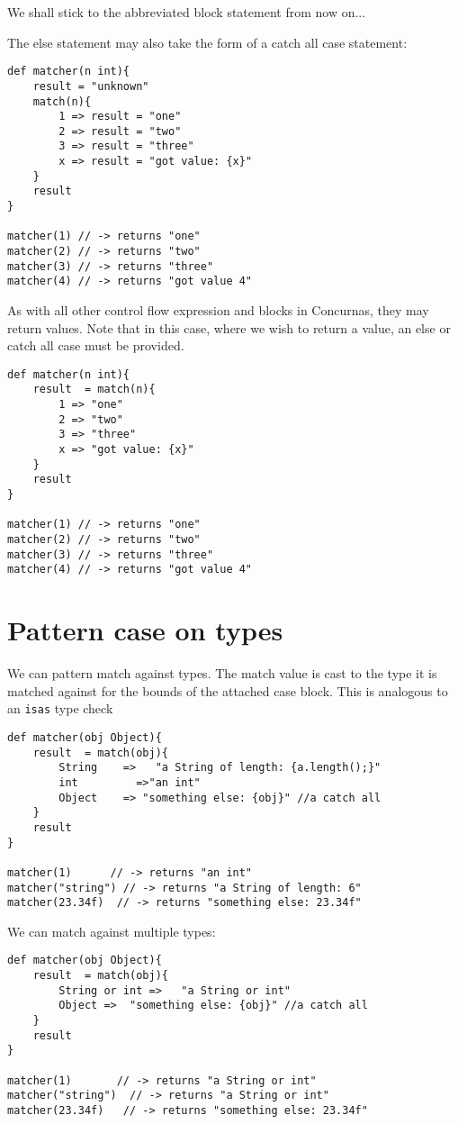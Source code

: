 \documentclass[conc-doc]{subfiles}
\begin{document}
We shall stick to the abbreviated block statement from now on...

The else statement may also take the form of a catch all case statement:
\begin{lstlisting}
def matcher(n int){
	result = "unknown"
	match(n){
		1 => result = "one" 
		2 => result = "two" 
		3 => result = "three" 
		x => result = "got value: {x}" 
	}
	result
}

matcher(1) // -> returns "one"
matcher(2) // -> returns "two"
matcher(3) // -> returns "three"
matcher(4) // -> returns "got value 4"
\end{lstlisting}

As with all other control flow expression and blocks in Concurnas, they may return values. Note that in this case, where we wish to return a value, an else or catch all case must be provided.

\begin{lstlisting}
def matcher(n int){
	result  = match(n){
		1 => "one" 
		2 => "two" 
		3 => "three" 
		x => "got value: {x}" 
	}
	result
}

matcher(1) // -> returns "one"
matcher(2) // -> returns "two"
matcher(3) // -> returns "three"
matcher(4) // -> returns "got value 4"
\end{lstlisting}

\section{Pattern case on types}
We can pattern match against types. The match value is cast to the type it is matched against for the bounds of the attached case block. This is analogous to an \lstinline{isas} type check

\begin{lstlisting}
def matcher(obj Object){
	result  = match(obj){
		String    =>   "a String of length: {a.length();}" 
		int 	    =>"an int" 
		Object    => "something else: {obj}" //a catch all
	}
	result
}

matcher(1) 	    // -> returns "an int"
matcher("string") // -> returns "a String of length: 6"
matcher(23.34f)  // -> returns "something else: 23.34f"
\end{lstlisting}

We can match against multiple types:

\begin{lstlisting}
def matcher(obj Object){
	result  = match(obj){
		String or int =>   "a String or int" 
		Object =>  "something else: {obj}" //a catch all
	}
	result
}

matcher(1)	     // -> returns "a String or int"
matcher("string")  // -> returns "a String or int"
matcher(23.34f)   // -> returns "something else: 23.34f"
\end{lstlisting}
\end{document}
